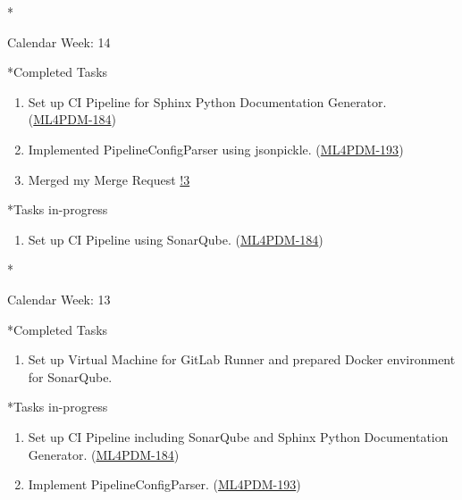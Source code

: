\documentclass[11pt,a4paper]{article}
\begin{document}
\newpage
\begin{section}*{Calendar Week: 14 \hfill \date{09 April, 2021}}
 \begin{refsection}
   \begin{subsection}*{Completed Tasks}
     \begin{enumerate}
       \item
             Set up CI Pipeline for Sphinx Python Documentation Generator.\\(\href{https://ml4pdm.atlassian.net/browse/ML4PDM-184}{ML4PDM-184})
       \item
             Implemented PipelineConfigParser using jsonpickle. (\href{https://ml4pdm.atlassian.net/browse/ML4PDM-193}{ML4PDM-193})
       \item
             Merged my Merge Request \href{https://git.cs.uni-paderborn.de/machine-learning-for-predictive-maintenance/code/-/merge_requests/3}{!3}
     \end{enumerate}
   \end{subsection}
   \begin{subsection}*{Tasks in-progress}
     \begin{enumerate}
       \item
             Set up CI Pipeline using SonarQube. (\href{https://ml4pdm.atlassian.net/browse/ML4PDM-184}{ML4PDM-184})
     \end{enumerate}
   \end{subsection}
 \end{refsection}
\end{section}

\newpage
\begin{section}*{Calendar Week: 13 \hfill \date{02 April, 2021}}
 \begin{refsection}
   \begin{subsection}*{Completed Tasks}
     \begin{enumerate}
       \item
             Set up Virtual Machine for GitLab Runner and prepared Docker environment for SonarQube.
     \end{enumerate}
   \end{subsection}
   \begin{subsection}*{Tasks in-progress}
     \begin{enumerate}
       \item
             Set up CI Pipeline including SonarQube and Sphinx Python Documentation Generator. (\href{https://ml4pdm.atlassian.net/browse/ML4PDM-184}{ML4PDM-184})
       \item
             Implement PipelineConfigParser. (\href{https://ml4pdm.atlassian.net/browse/ML4PDM-193}{ML4PDM-193})
     \end{enumerate}
   \end{subsection}
 \end{refsection}
\end{section}
\end{document}
